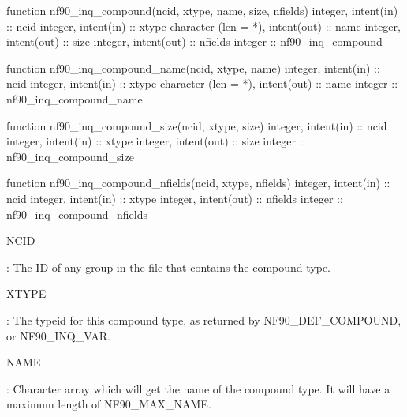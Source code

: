 \begin{DoxyCode}
\textcolor{keyword}{function }nf90\_inq\_compound(ncid, xtype, name, size, nfields)
  \textcolor{keywordtype}{integer}, \textcolor{keywordtype}{intent(in)} :: ncid
  \textcolor{keywordtype}{integer}, \textcolor{keywordtype}{intent(in)} :: xtype
  \textcolor{keywordtype}{character (len = *)}, \textcolor{keywordtype}{intent(out)} :: name
  \textcolor{keywordtype}{integer}, \textcolor{keywordtype}{intent(out)} :: size
  \textcolor{keywordtype}{integer}, \textcolor{keywordtype}{intent(out)} :: nfields
  \textcolor{keywordtype}{integer} :: nf90\_inq\_compound

\textcolor{keyword}{function }nf90\_inq\_compound\_name(ncid, xtype, name)
  \textcolor{keywordtype}{integer}, \textcolor{keywordtype}{intent(in)} :: ncid
  \textcolor{keywordtype}{integer}, \textcolor{keywordtype}{intent(in)} :: xtype
  \textcolor{keywordtype}{character (len = *)}, \textcolor{keywordtype}{intent(out)} :: name
  \textcolor{keywordtype}{integer} :: nf90\_inq\_compound\_name

\textcolor{keyword}{function }nf90\_inq\_compound\_size(ncid, xtype, size)
  \textcolor{keywordtype}{integer}, \textcolor{keywordtype}{intent(in)} :: ncid
  \textcolor{keywordtype}{integer}, \textcolor{keywordtype}{intent(in)} :: xtype
  \textcolor{keywordtype}{integer}, \textcolor{keywordtype}{intent(out)} :: size
  \textcolor{keywordtype}{integer} :: nf90\_inq\_compound\_size

\textcolor{keyword}{function }nf90\_inq\_compound\_nfields(ncid, xtype, nfields)
  \textcolor{keywordtype}{integer}, \textcolor{keywordtype}{intent(in)} :: ncid
  \textcolor{keywordtype}{integer}, \textcolor{keywordtype}{intent(in)} :: xtype
  \textcolor{keywordtype}{integer}, \textcolor{keywordtype}{intent(out)} :: nfields
  \textcolor{keywordtype}{integer} :: nf90\_inq\_compound\_nfields
\end{DoxyCode}


{\ttfamily N\+C\+ID}

\+: The ID of any group in the file that contains the compound type.

{\ttfamily X\+T\+Y\+PE}

\+: The typeid for this compound type, as returned by N\+F90\+\_\+\+D\+E\+F\+\_\+\+C\+O\+M\+P\+O\+U\+ND, or N\+F90\+\_\+\+I\+N\+Q\+\_\+\+V\+AR.

{\ttfamily N\+A\+ME}

\+: Character array which will get the name of the compound type. It will have a maximum length of N\+F90\+\_\+\+M\+A\+X\+\_\+\+N\+A\+ME.

